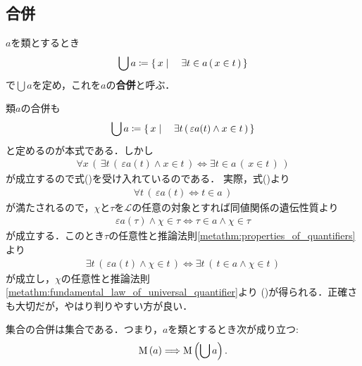 \subsection{合併}
	\begin{screen}
		\begin{dfn}[合併]
			$a$を類とするとき
			\begin{align}
				\bigcup a \coloneqq \left\{\, x \mid \quad \exists t \in a\, (\, x \in t\, )\, \right\}
				\label{eq:definition_of_union_1}
			\end{align}
			で$\bigcup a$を定め，これを$a$の{\bf 合併}と呼ぶ．
		\end{dfn}
	\end{screen}
	
	類$a$の合併も
	\begin{align}
		\bigcup a \coloneqq \left\{\, x \mid \quad \exists t\, (\, \varepsilon a(t) \wedge x \in t\, )\, \right\}
	\end{align}
	と定めるのが本式である．しかし
	\begin{align}
		\forall x\, \left(\, \exists t\, (\, \varepsilon a(t) \wedge x \in t\, )
		\Longleftrightarrow \exists t \in a\, (\, x \in t\, )\, \right)
		\label{eq:definition_of_union_2}
	\end{align}
	が成立するので式()を受け入れているのである．
	実際，式()より
	\begin{align}
		\forall t\, \left(\, \varepsilon a(t) \Longleftrightarrow t \in a\, \right)
	\end{align}
	が満たされるので，$\chi$と$\tau$を$\mathcal{L}$の任意の対象とすれば同値関係の遺伝性質より
	\begin{align}
		\varepsilon a(\tau) \wedge \chi \in \tau \Longleftrightarrow \tau \in a \wedge \chi \in \tau
	\end{align}
	が成立する．このとき$\tau$の任意性と推論法則\ref{metathm:properties_of_quantifiers}より
	\begin{align}
		\exists t\, (\, \varepsilon a(t) \wedge \chi \in t\, )
		\Longleftrightarrow \exists t\, (\, t \in a \wedge \chi \in t\, )
	\end{align}
	が成立し，$\chi$の任意性と推論法則\ref{metathm:fundamental_law_of_universal_quantifier}より
	()が得られる．正確さも大切だが，やはり判りやすい方が良い．
	
	\begin{screen}
		\begin{axm}[合併の公理]
			集合の合併は集合である．つまり，$a$を類とするとき次が成り立つ:
			\begin{align}
				\operatorname*{M}\left(a\right) \Longrightarrow \operatorname*{M}\left(\bigcup a\right).
			\end{align}
		\end{axm}
	\end{screen}
	
